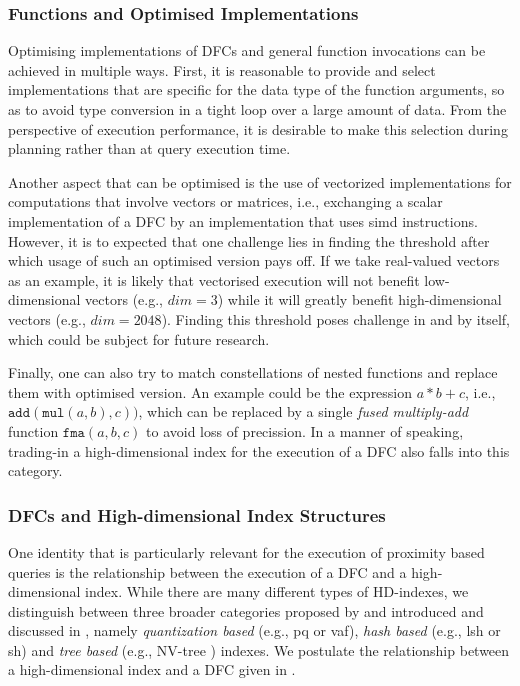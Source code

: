 \subsubsection{Functions and Optimised Implementations}

Optimising implementations of DFCs and general function invocations can be achieved in multiple ways. First, it is reasonable to provide and select implementations that are specific for the data type of the function arguments, so as to avoid type conversion in a tight loop over a large amount of data. From the perspective of execution performance, it is desirable to make this selection during planning rather than at query execution time.

Another aspect that can be optimised is the use of vectorized implementations for computations that involve vectors or matrices, i.e., exchanging a scalar implementation of a DFC by an implementation that uses \acrshort{simd} instructions. However, it is to expected that one challenge lies in finding the threshold after which usage of such an optimised version pays off. If we take real-valued vectors as an example, it is likely that vectorised execution will not benefit low-dimensional vectors (e.g., $dim = 3$) while it will greatly benefit high-dimensional vectors (e.g., $dim = 2048$). Finding this threshold poses challenge in and by itself, which could be subject for future research.

Finally, one can also try to match constellations of nested functions and replace them with optimised version. An example could be the expression $a * b + c$, i.e., $\mathtt{add}(\mathtt{mul}(a,b), c))$, which can be replaced by a single \emph{fused multiply-add} function $\mathtt{fma}(a,b,c)$ to avoid loss of precission. In a manner of speaking, trading-in a high-dimensional index for the execution of a DFC also falls into this category.

\subsubsection{DFCs and High-dimensional Index Structures}

One identity that is particularly relevant for the execution of proximity based queries is the relationship between the execution of a DFC and a high-dimensional index. While there are many different types of HD-indexes, we distinguish between three broader categories proposed by \cite{Lejsek:2018Transactional} and introduced and discussed in , namely \emph{quantization based} (e.g., \acrshort{pq} or \acrshort{vaf}), \emph{hash based} (e.g., \acrshort{lsh} or \acrshort{sh}) and \emph{tree based} (e.g., NV-tree \cite{Lejsek:2011NVTree}) indexes. We postulate the relationship between a high-dimensional index and a DFC given in . 

